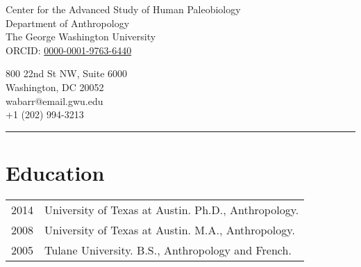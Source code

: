 \documentclass{article}
\begin{document}
\begin{center}
\end{center}

\vspace{15pt}

\noindent\begin{minipage}{.60\textwidth}
\begin{flushleft}
Center for the Advanced Study of Human Paleobiology\\
Department of Anthropology\\
The George Washington University\\
ORCID: \href{https://orcid.org/0000-0001-9763-6440}{0000-0001-9763-6440}\\
\end{flushleft}
\end{minipage}
\begin{minipage}{.395\textwidth}
\begin{flushright}
800 22nd St NW, Suite 6000\\
Washington, DC 20052 \\
wabarr@email.gwu.edu\\
+1 (202) 994-3213\\
\end{flushright}
\end{minipage}


\noindent\rule[-2mm]{\textwidth}{1pt}

\section*{Education}

\begin{tabular}{p{}p{}}
2014 & University of Texas at Austin. Ph.D., Anthropology. \\[4pt] %
2008 & University of Texas at Austin. M.A., Anthropology. \\[4pt]
2005 & Tulane University. B.S., Anthropology and French.\\
\end{tabular} 
\end{document}
